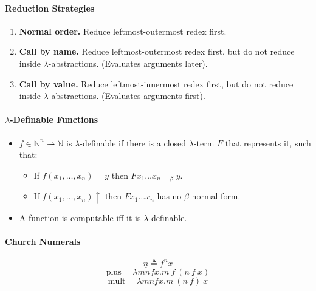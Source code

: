 \documentclass[twocolumn,english]{article}
\begin{document}
\paragraph{Reduction Strategies}
\begin{enumerate}
\item \textbf{Normal order.} Reduce leftmost-outermost redex first.
\item \textbf{Call by name.} Reduce leftmost-outermost redex first, but
do not reduce inside $\lambda$-abstractions. (Evaluates arguments
later).
\item \textbf{Call by value.} Reduce leftmost-innermost redex first, but
do not reduce inside $\lambda$-abstractions. (Evaluates arguments
first).
\end{enumerate}

\paragraph{$\lambda$-Definable Functions}
\begin{itemize}
\item $f\in\mathbb{N}^{n}\rightharpoonup\mathbb{N}$ is $\lambda$-definable
if there is a closed $\lambda$-term $F$ that represents it, such
that: 

\begin{itemize}
\item If $f\left(x_{1},\dots,x_{n}\right)=y$ then $Fx_{1}\dots x_{n}=_{\beta}y$. 
\item If $f\left(x_{1},\dots,x_{n}\right)\uparrow$ then $Fx_{1}\dots x_{n}$
has no $\beta$-normal form. 
\end{itemize}
\item A function is computable iff it is $\lambda$-definable. 
\end{itemize}

\paragraph{Church Numerals}

\[
\underline{n}\triangleq f^{n}x
\]
\[
\text{plus}=\lambda mnfx.m\:f\:\left(n\:f\:x\right)
\]
\[
\text{mult}=\lambda mnfx.m\:\left(n\:f\right)\:x
\]
\end{document}
